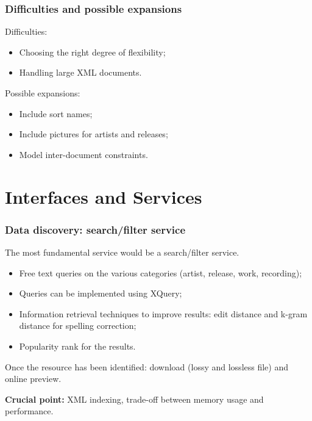 \documentclass{beamer}
\newcommand\rb[1]{\textcolor{ThemeRed}{\textbf{#1}}}
\begin{document}
  
  \begin{frame}
    \frametitle{Difficulties and possible expansions}
    
    Difficulties:
    
    \vspace{0.5em}
    
    \begin{itemize}
      \itemsep0.5em
      \item Choosing the right degree of flexibility;
      \item Handling large XML documents.      
    \end{itemize}

    \vspace{1em}
    
    Possible expansions:
    
    \vspace{0.5em}
    
    \begin{itemize}
      \itemsep0.5em
      \item Include sort names;
      \item Include pictures for artists and releases;
      \item Model inter-document constraints.
    \end{itemize}

  \end{frame}



\section{Interfaces and Services}

  \begin{frame}
    \frametitle{Data discovery: search/filter service}

    The most fundamental service would be a search/filter service.

    \vspace{0.5em}

    \begin{itemize}
      \item Free text queries on the various categories (artist, release, work, recording);
      \item Queries can be implemented using XQuery;
      \item Information retrieval techniques to improve results: edit distance and k-gram distance for spelling correction;
      \item Popularity rank for the results.
    \end{itemize}


    \vspace{1em}

    Once the resource has been identified: download (lossy and lossless file) and online preview.

    \vspace{1em}

    \rb{Crucial point:} XML indexing, trade-off between memory usage and performance.

  \end{frame}
\end{document}

